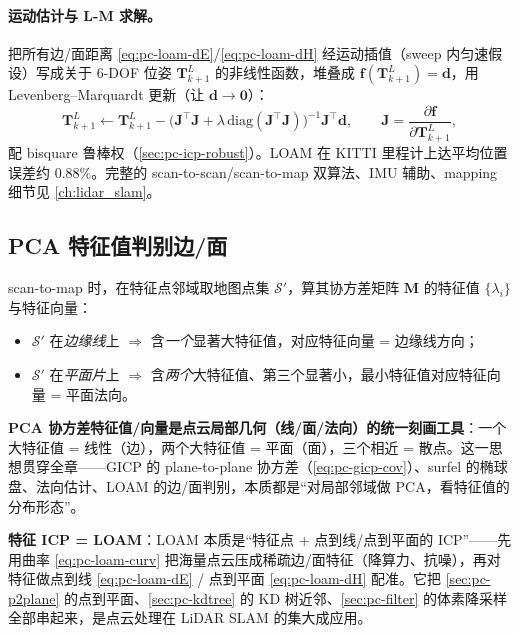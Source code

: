 \paragraph{运动估计与 L-M 求解。}
把所有边/面距离 \cref{eq:pc-loam-dE}/\cref{eq:pc-loam-dH} 经运动插值（sweep 内匀速假设）写成关于 $6$-DOF 位姿 $\mathbf{T}^L_{k+1}$ 的非线性函数，堆叠成 $\mathbf{f}(\mathbf{T}^L_{k+1})=\mathbf{d}$，用 Levenberg--Marquardt 更新（让 $\mathbf{d}\to\mathbf{0}$）：
\begin{equation}
  \mathbf{T}^L_{k+1}\leftarrow\mathbf{T}^L_{k+1}-\big(\mathbf{J}^\top\mathbf{J}+\lambda\,\mathrm{diag}(\mathbf{J}^\top\mathbf{J})\big)^{-1}\mathbf{J}^\top\mathbf{d},\qquad \mathbf{J}=\frac{\partial\mathbf{f}}{\partial\mathbf{T}^L_{k+1}},
  \label{eq:pc-loam-lm}
\end{equation}
配 bisquare 鲁棒权（\cref{sec:pc-icp-robust}）。LOAM 在 KITTI 里程计上达平均位置误差约 $0.88\%$\cite{zhang2014loam}。完整的 scan-to-scan/scan-to-map 双算法、IMU 辅助、mapping 细节见 \cref{ch:lidar_slam}。

\subsection{PCA 特征值判别边/面}
\label{sec:pc-loam-pca}

scan-to-map 时，在特征点邻域取地图点集 $\mathcal{S}'$，算其协方差矩阵 $\mathbf{M}$ 的特征值 $\{\lambda_i\}$ 与特征向量：
\begin{itemize}
  \item $\mathcal{S}'$ 在\emph{边缘线}上 $\Rightarrow$ 含\emph{一个}显著大特征值，对应特征向量 = 边缘线方向；
  \item $\mathcal{S}'$ 在\emph{平面片}上 $\Rightarrow$ 含\emph{两个}大特征值、第三个显著小，最小特征值对应特征向量 = 平面法向。
\end{itemize}

\begin{insight}
\textbf{PCA 协方差特征值/向量是点云局部几何（线/面/法向）的统一刻画工具}：一个大特征值 = 线性（边），两个大特征值 = 平面（面），三个相近 = 散点。这一思想贯穿全章——GICP 的 plane-to-plane 协方差（\cref{eq:pc-gicp-cov}）、surfel 的椭球盘、法向估计、LOAM 的边/面判别，本质都是“对局部邻域做 PCA，看特征值的分布形态”。
\end{insight}

\begin{insight}
\textbf{特征 ICP = LOAM}：LOAM 本质是“特征点 + 点到线/点到平面的 ICP”——先用曲率 \cref{eq:pc-loam-curv} 把海量点云压成稀疏边/面特征（降算力、抗噪），再对特征做点到线 \cref{eq:pc-loam-dE} / 点到平面 \cref{eq:pc-loam-dH} 配准。它把 \cref{sec:pc-p2plane} 的点到平面、\cref{sec:pc-kdtree} 的 KD 树近邻、\cref{sec:pc-filter} 的体素降采样全部串起来，是点云处理在 LiDAR SLAM 的集大成应用。
\end{insight}

